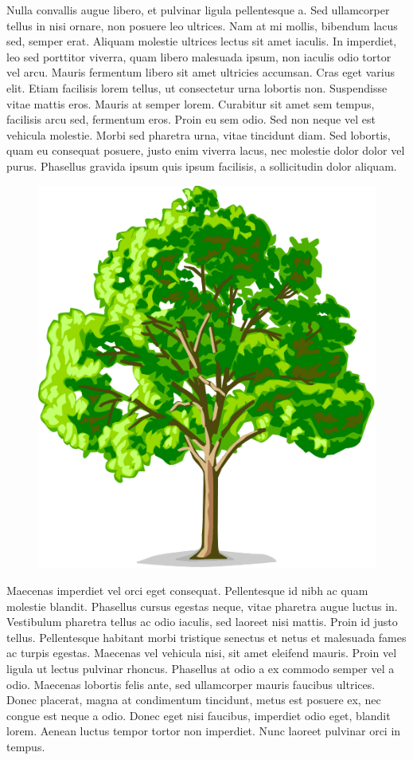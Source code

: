 \documentclass{article}
\begin{document}
 Nulla convallis augue libero, et pulvinar ligula pellentesque a. Sed ullamcorper tellus in nisi ornare, non posuere leo ultrices. Nam at mi mollis, bibendum lacus sed, semper erat. Aliquam molestie ultrices lectus sit amet iaculis. In imperdiet, leo sed porttitor viverra, quam libero malesuada ipsum, non iaculis odio tortor vel arcu. Mauris fermentum libero sit amet ultricies accumsan. Cras eget varius elit. Etiam facilisis lorem tellus, ut consectetur urna lobortis non. Suspendisse vitae mattis eros. Mauris at semper lorem. Curabitur sit amet sem tempus, facilisis arcu sed, fermentum eros. Proin eu sem odio. Sed non neque vel est vehicula molestie. Morbi sed pharetra urna, vitae tincidunt diam. Sed lobortis, quam eu consequat posuere, justo enim viverra lacus, nec molestie dolor dolor vel purus. Phasellus gravida ipsum quis ipsum facilisis, a sollicitudin dolor aliquam. 


\begin{figure}[h]
\centering
\includegraphics{tree.gif}
\end{figure}


 Maecenas imperdiet vel orci eget consequat. Pellentesque id nibh ac quam molestie blandit. Phasellus cursus egestas neque, vitae pharetra augue luctus in. Vestibulum pharetra tellus ac odio iaculis, sed laoreet nisi mattis. Proin id justo tellus. Pellentesque habitant morbi tristique senectus et netus et malesuada fames ac turpis egestas. Maecenas vel vehicula nisi, sit amet eleifend mauris. Proin vel ligula ut lectus pulvinar rhoncus. Phasellus at odio a ex commodo semper vel a odio. Maecenas lobortis felis ante, sed ullamcorper mauris faucibus ultrices. Donec placerat, magna at condimentum tincidunt, metus est posuere ex, nec congue est neque a odio. Donec eget nisi faucibus, imperdiet odio eget, blandit lorem. Aenean luctus tempor tortor non imperdiet. Nunc laoreet pulvinar orci in tempus. 
\end{document}
